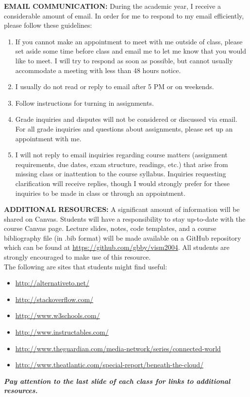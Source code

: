 \documentclass[10pt]{article}
\begin{document}
\textbf{EMAIL COMMUNICATION:} 
During the academic year, I receive a considerable amount of email. In order for me to respond to my email efficiently, please follow these guidelines:
\begin{enumerate}[nosep]
	\item If you cannot make an appointment to meet with me outside of class, please set aside some time before class and email me to let me know that you would like to meet. I will try to respond as soon as possible, but cannot usually accommodate a meeting with less than 48 hours notice.
	\item I usually do not read or reply to email after 5 PM or on weekends. 
	\item Follow instructions for turning in assignments. 
	\item Grade inquiries and disputes will not be considered or discussed via email. For all grade inquiries and questions about assignments, please set up an appointment with me. 
	\item I will not reply to email inquiries regarding course matters (assignment requirements, due dates, exam structure, readings, etc.) that arise from missing class or inattention to the course syllabus. Inquiries requesting clarification will receive replies, though I would strongly prefer for these inquiries to be made in class or through an appointment.
\end{enumerate}

\textbf{ADDITIONAL RESOURCES:}
A significant amount of information will be shared on Canvas. Students will have a responsibility to stay up-to-date with the course Canvas page. Lecture slides, notes, code templates, and a course bibliography file (in .bib format) will be made available on a GitHub repository which can be found at \url{https://github.com/gbby/vism2004}. All students are strongly encouraged to make use of this resource.\\ 
The following are sites that students might find useful:
 \begin{itemize}[noitemsep,nolistsep]
 	\item \url{http://alternativeto.net/}
 	\item \url{http://stackoverflow.com/}
 	\item \url{http://www.w3schools.com/}
 	\item \url{http://www.instructables.com/}
 	\item \url{http://www.theguardian.com/media-network/series/connected-world}
 	\item \url{http://www.theatlantic.com/special-report/beneath-the-cloud/}
 \end{itemize}
\textbf{\textit{Pay attention to the last slide of each class for links to additional resources.}}
\end{document}
